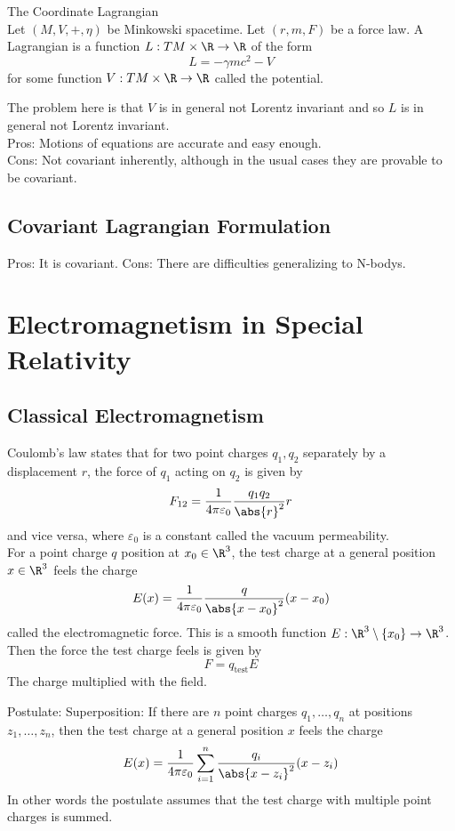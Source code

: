 \documentclass[a4paper]{article}
\begin{document}
\begin{defn}{The Coordinate Lagrangian}{}\\
Let $(M,V,+,\eta)$ be Minkowski spacetime. Let $(r,m,F)$ be a force law. A Lagrangian is a function $L:TM\times\R\to\R$ of the form $$L=-\gamma mc^2-V$$ for some function $V:TM\times\R\to\R$ called the potential. 
\end{defn}

The problem here is that $V$ is in general not Lorentz invariant and so $L$ is in general not Lorentz invariant. \\

Pros: Motions of equations are accurate and easy enough. \\
Cons: Not covariant inherently, although in the usual cases they are provable to be covariant. 

\subsection{Covariant Lagrangian Formulation}


Pros: It is covariant. 
Cons: There are difficulties generalizing to N-bodys. 

\pagebreak
\section{Electromagnetism in Special Relativity}
\subsection{Classical Electromagnetism}
Coulomb's law states that for two point charges $q_1,q_2$ separately by a displacement $r$, the force of $q_1$ acting on $q_2$ is given by $$F_{12}=\frac{1}{4\pi\varepsilon_0}\frac{q_1q_2}{\abs{r}^2}r$$ and vice versa, where $\varepsilon_0$ is a constant called the vacuum permeability. \\

For a point charge $q$ position at $x_0\in\R^3$, the test charge at a general position $x\in\R^3$ feels the charge $$E(x)=\frac{1}{4\pi\varepsilon_0}\frac{q}{\abs{x-x_0}^2}(x-x_0)$$ called the electromagnetic force. This is a smooth function $E:\R^3\setminus\{x_0\}\to\R^3$. Then the force the test charge feels is given by $$F=q_\text{test}E$$ The charge multiplied with the field. 

Postulate: Superposition: If there are $n$ point charges $q_1,\dots,q_n$ at positions $z_1,\dots,z_n$, then the test charge at a general position $x$ feels the charge $$E(x)=\frac{1}{4\pi\varepsilon_0}\sum_{i=1}^n\frac{q_i}{\abs{x-z_i}^2}(x-z_i)$$ In other words the postulate assumes that the test charge with multiple point charges is summed. \\
\end{document}
